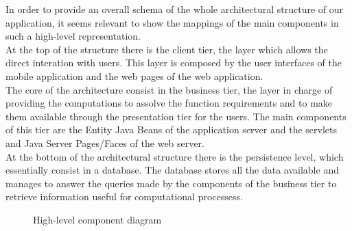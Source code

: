 In order to provide an overall schema of the whole architectural structure of our application, it seems relevant to show the mappings of the main components in such a high-level representation. \\
At the top of the structure there is the client tier, the layer which allows the direct interation with users. This layer is composed by the user interfaces of the mobile application and the web pages of the web application. \\
The core of the architecture consist in the business tier, the layer in charge of providing the computations to assolve the function requirements and to make them available through the presentation tier for the users. The main components of this tier are the Entity Java Beans of the application server and the servlets and Java Server Pages/Faces of the web server. \\
At the bottom of the architectural structure there is the persistence level, which essentially consist in a database. The database stores all the data available and manages to answer the queries made by the components of the business tier to retrieve information useful for computational processess.\\ 



\begin{figure} 
\begin{center}

\caption{High-level component diagram} 
\label{fig:hlcomponentdiagram} 


\end{center}
\end{figure} 
